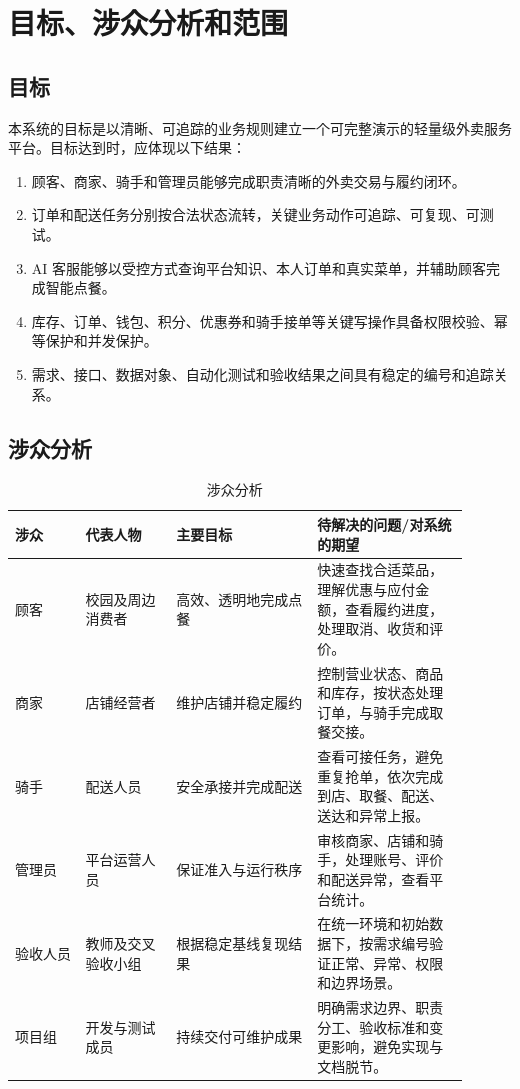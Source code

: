 \section{目标、涉众分析和范围}

\subsection{目标}

本系统的目标是以清晰、可追踪的业务规则建立一个可完整演示的轻量级外卖服务平台。目标达到时，应体现以下结果：

\begin{enumerate}
  \item 顾客、商家、骑手和管理员能够完成职责清晰的外卖交易与履约闭环。
  \item 订单和配送任务分别按合法状态流转，关键业务动作可追踪、可复现、可测试。
  \item AI 客服能够以受控方式查询平台知识、本人订单和真实菜单，并辅助顾客完成智能点餐。
  \item 库存、订单、钱包、积分、优惠券和骑手接单等关键写操作具备权限校验、幂等保护和并发保护。
  \item 需求、接口、数据对象、自动化测试和验收结果之间具有稳定的编号和追踪关系。
\end{enumerate}

\subsection{涉众分析}

\begin{longtable}{|L{0.14\linewidth}|L{0.18\linewidth}|L{0.28\linewidth}|L{0.30\linewidth}|}
\caption{涉众分析}\label{tab:stakeholders}\\ \hline
\textbf{涉众} & \textbf{代表人物} & \textbf{主要目标} & \textbf{待解决的问题/对系统的期望} \\ \hline
顾客 & 校园及周边消费者 & 高效、透明地完成点餐 & 快速查找合适菜品，理解优惠与应付金额，查看履约进度，处理取消、收货和评价。 \\ \hline
商家 & 店铺经营者 & 维护店铺并稳定履约 & 控制营业状态、商品和库存，按状态处理订单，与骑手完成取餐交接。 \\ \hline
骑手 & 配送人员 & 安全承接并完成配送 & 查看可接任务，避免重复抢单，依次完成到店、取餐、配送、送达和异常上报。 \\ \hline
管理员 & 平台运营人员 & 保证准入与运行秩序 & 审核商家、店铺和骑手，处理账号、评价和配送异常，查看平台统计。 \\ \hline
验收人员 & 教师及交叉验收小组 & 根据稳定基线复现结果 & 在统一环境和初始数据下，按需求编号验证正常、异常、权限和边界场景。 \\ \hline
项目组 & 开发与测试成员 & 持续交付可维护成果 & 明确需求边界、职责分工、验收标准和变更影响，避免实现与文档脱节。 \\ \hline
\end{longtable}

